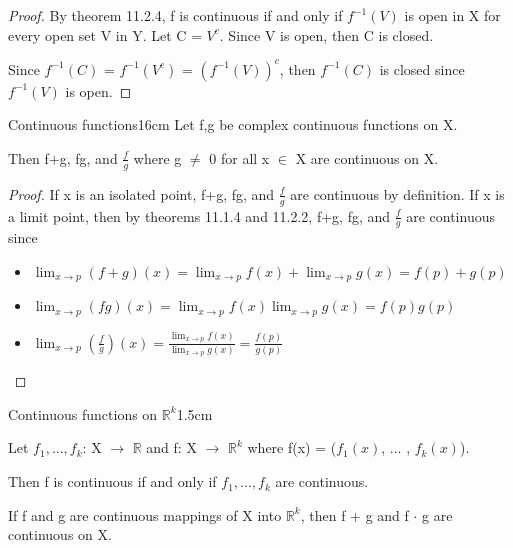     \begin{proof}
        By {\color{red} theorem 11.2.4}, f is continuous
        if and only if $f^{-1}(V)$ is open in X for every open set V in Y.
        Let C = $V^c$.
        Since V is open, then C is closed.

        Since $f^{-1}(C)$
        = $f^{-1}(V^c)$
        = $(f^{-1}(V))^c$,
        then $f^{-1}(C)$ is closed since $f^{-1}(V)$ is open.
    \end{proof}

    \vspace{0.5cm}



    \begin{wtheorem}{Continuous functions}{16cm}
        Let f,g be complex continuous functions on X.

        Then f+g, fg, and $\frac{f}{g}$ where g $\not =$ 0 for all x $\in$ X
        are continuous on X.
    \end{wtheorem}

    \begin{proof}
        If x is an isolated point, f+g, fg, and $\frac{f}{g}$
        are continuous by definition.
        If x is a limit point, then by {\color{red} theorems 11.1.4 and 11.2.2},
        f+g, fg, and $\frac{f}{g}$ are continuous since

        \begin{itemize}[leftmargin=1cm, itemsep=0.1cm]
            \item $\lim_{x \rightarrow p} (f+g)(x)
                = \lim_{x \rightarrow p} f(x) + \lim_{x \rightarrow p} g(x)
                = f(p) + g(p)$
            \item $\lim_{x \rightarrow p} (fg)(x)
                = \lim_{x \rightarrow p} f(x) \lim_{x \rightarrow p} g(x)
                = f(p) g(p)$
            \item $\lim_{x \rightarrow p} (\frac{f}{g})(x)
                = \frac{\lim_{x \rightarrow p} f(x)}{\lim_{x \rightarrow p} g(x)}
                = \frac{f(p)}{g(p)}$
        \end{itemize}
    \end{proof}

    \vspace{0.5cm}



    \begin{ltheorem}{Continuous functions on $\mathbb{R}^k$}{1.5cm}
        \item Let $f_1,...,f_k$: X $\rightarrow$ $\mathbb{R}$ and
            f: X $\rightarrow$ $\mathbb{R}^k$ where
            f(x) = ($f_1(x)$, ... , $f_k(x)$).

            Then f is continuous if and only if $f_1,...,f_k$ are continuous.

        \item If f and g are continuous mappings of X into $\mathbb{R}^k$,
            then f + g and f $\cdot$ g are continuous on X.
    \end{ltheorem}

